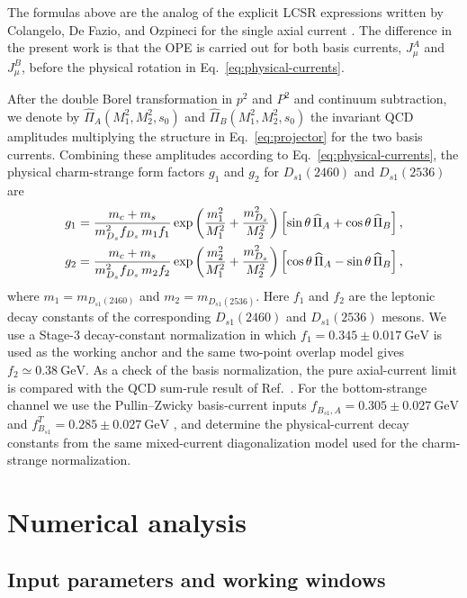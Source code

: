 \documentclass[aps,prd,preprint,nofootinbib,superscriptaddress]{revtex4-2}
\newcommand{\Ds}{D_s}
\newcommand{\Dsone}{D_{s1}}
\newcommand{\Bsone}{B_{s1}}
\newcommand{\GeV}{\mathrm{GeV}}
\begin{document}
The formulas above are the analog of the explicit LCSR expressions written by
Colangelo, De Fazio, and Ozpineci for the single axial current
\cite{Colangelo:2005hv}.  The difference in the present work is that the OPE
is carried out for both basis currents, $J_\mu^A$ and $J_\mu^B$, before the
physical rotation in Eq.~\eqref{eq:physical-currents}.

After the double Borel transformation in $p^2$ and $P^2$ and continuum
subtraction, we denote by
$\widehat\Pi_A(M_1^2,M_2^2,s_0)$ and
$\widehat\Pi_B(M_1^2,M_2^2,s_0)$ the invariant QCD amplitudes multiplying the
structure in Eq.~\eqref{eq:projector} for the two basis currents.  Combining
these amplitudes according to Eq.~\eqref{eq:physical-currents}, the physical
charm-strange form factors $g_1$ and $g_2$ for
$\Dsone(2460)$ and $\Dsone(2536)$ are
\begin{align}
  g_1 &=
  \frac{m_c+m_s}{m_{\Ds}^2 f_{\Ds}\,m_1 f_1}
  \exp\left(\frac{m_1^2}{M_1^2}+\frac{m_{\Ds}^2}{M_2^2}\right)
  \left[
    \sin\theta\,\widehat\Pi_A
    +\cos\theta\,\widehat\Pi_B
  \right],
  \notag\\
  g_2 &=
  \frac{m_c+m_s}{m_{\Ds}^2 f_{\Ds}\,m_2 f_2}
  \exp\left(\frac{m_2^2}{M_1^2}+\frac{m_{\Ds}^2}{M_2^2}\right)
  \left[
    \cos\theta\,\widehat\Pi_A
    -\sin\theta\,\widehat\Pi_B
  \right],
  \label{eq:physical-sum-rules}
\end{align}
where $m_1=m_{\Dsone(2460)}$ and $m_2=m_{\Dsone(2536)}$.
Here $f_1$ and $f_2$ are the leptonic decay constants of the corresponding
$\Dsone(2460)$ and $\Dsone(2536)$ mesons.  We use a Stage-3 decay-constant
normalization in which $f_1=0.345\pm0.017~\GeV$ is used as the working anchor
and the same two-point overlap model gives $f_2\simeq0.38~\GeV$.  As a check of
	the basis normalization, the pure axial-current limit is compared with the QCD
	sum-rule result of Ref.~\cite{Wang:2015mxa}.  For the bottom-strange channel we
	use the Pullin--Zwicky basis-current inputs
	$f_{\Bsone,A}=0.305\pm0.027~\GeV$ and
	$f_{\Bsone}^{T}=0.285\pm0.027~\GeV$ \cite{Pullin:2021ebn}, and determine the
	physical-current decay constants from the same mixed-current diagonalization
	model used for the charm-strange normalization.

\section{Numerical analysis}
\label{sec:numerics}

\subsection{Input parameters and working windows}
\end{document}

